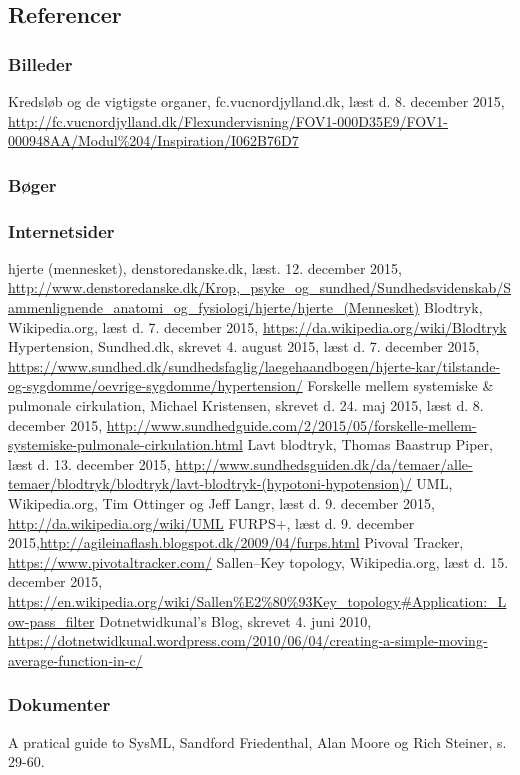 \begin{thebibliography}{99}
\section{Referencer}
\subsubsection{Billeder}
Kredsløb og de vigtigste organer, fc.vucnordjylland.dk, læst d. 8. december 2015, \url{http://fc.vucnordjylland.dk/Flexundervisning/FOV1-000D35E9/FOV1-000948AA/Modul\%204/Inspiration/I062B76D7}
\subsubsection{Bøger}

\subsubsection{Internetsider}
hjerte (mennesket), denstoredanske.dk, læst. 12. december 2015, \url{http://www.denstoredanske.dk/Krop,_psyke_og_sundhed/Sundhedsvidenskab/Sammenlignende_anatomi_og_fysiologi/hjerte/hjerte_(Mennesket)}
Blodtryk, Wikipedia.org, læst d. 7. december 2015, \url{https://da.wikipedia.org/wiki/Blodtryk}
Hypertension, Sundhed.dk, skrevet 4. august 2015, læst d. 7. december 2015,
\url{https://www.sundhed.dk/sundhedsfaglig/laegehaandbogen/hjerte-kar/tilstande-og-sygdomme/oevrige-sygdomme/hypertension/}
Forskelle mellem systemiske \& pulmonale cirkulation, Michael Kristensen, skrevet d. 24. maj 2015, læst d. 8. december 2015, \url{http://www.sundhedguide.com/2/2015/05/forskelle-mellem-systemiske-pulmonale-cirkulation.html}
Lavt blodtryk, Thomas Baastrup Piper, læst d. 13. december 2015, \url{http://www.sundhedsguiden.dk/da/temaer/alle-temaer/blodtryk/blodtryk/lavt-blodtryk-(hypotoni-hypotension)/}
UML, Wikipedia.org, Tim Ottinger og Jeff Langr, læst d. 9. december 2015, \url{http://da.wikipedia.org/wiki/UML}
FURPS+, læst d. 9. december 2015,\url{http://agileinaflash.blogspot.dk/2009/04/furps.html}
Pivoval Tracker, \url{https://www.pivotaltracker.com/}
Sallen–Key topology, Wikipedia.org, læst d. 15. december 2015, \url{https://en.wikipedia.org/wiki/Sallen\%E2\%80\%93Key_topology#Application:_Low-pass_filter}
Dotnetwidkunal's Blog, skrevet 4. juni 2010,
\url{https://dotnetwidkunal.wordpress.com/2010/06/04/creating-a-simple-moving-average-function-in-c/}
\subsubsection{Dokumenter}
A pratical guide to SysML, Sandford Friedenthal, Alan Moore og Rich Steiner, s. 29-60.
\end{thebibliography}
